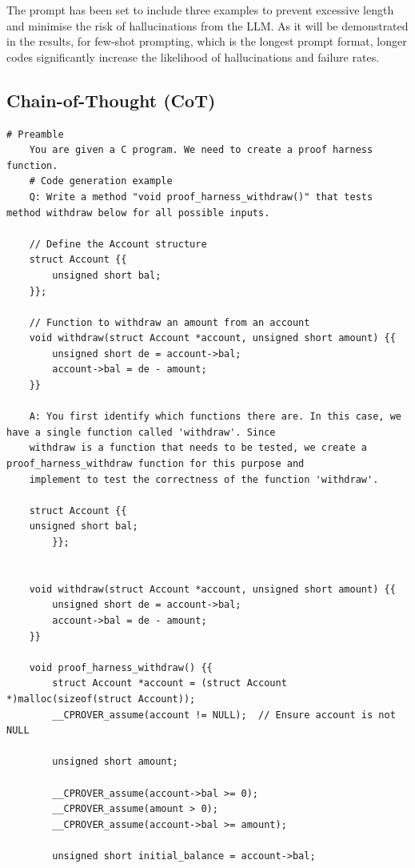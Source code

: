 \documentclass[onecolumn]{NobArticle}
\begin{document}
The prompt has been set to include three examples to prevent excessive length and minimise the risk of hallucinations from the LLM. As it will be demonstrated in the results, for few-shot prompting, which is the longest prompt format, longer codes significantly increase the likelihood of hallucinations and failure rates.

\vspace{11pt}
\subsection{Chain-of-Thought (CoT)}
\begin{lstlisting}[caption=Generated Proof Harness Function]
  # Preamble
    You are given a C program. We need to create a proof harness function.
    # Code generation example
    Q: Write a method "void proof_harness_withdraw()" that tests method withdraw below for all possible inputs.

    // Define the Account structure
    struct Account {{
        unsigned short bal;
    }};

    // Function to withdraw an amount from an account
    void withdraw(struct Account *account, unsigned short amount) {{ 
        unsigned short de = account->bal;
        account->bal = de - amount; 
    }}

    A: You first identify which functions there are. In this case, we have a single function called 'withdraw'. Since 
    withdraw is a function that needs to be tested, we create a proof_harness_withdraw function for this purpose and 
    implement to test the correctness of the function 'withdraw'.
    
    struct Account {{
    unsigned short bal;
        }};
    
    
    void withdraw(struct Account *account, unsigned short amount) {{
        unsigned short de = account->bal;
        account->bal = de - amount;
    }}
    
    void proof_harness_withdraw() {{
        struct Account *account = (struct Account *)malloc(sizeof(struct Account));
        __CPROVER_assume(account != NULL);  // Ensure account is not NULL
    
        unsigned short amount;
    
        __CPROVER_assume(account->bal >= 0);
        __CPROVER_assume(amount > 0);
        __CPROVER_assume(account->bal >= amount);
    
        unsigned short initial_balance = account->bal;
    

\end{lstlisting}
\end{document}
